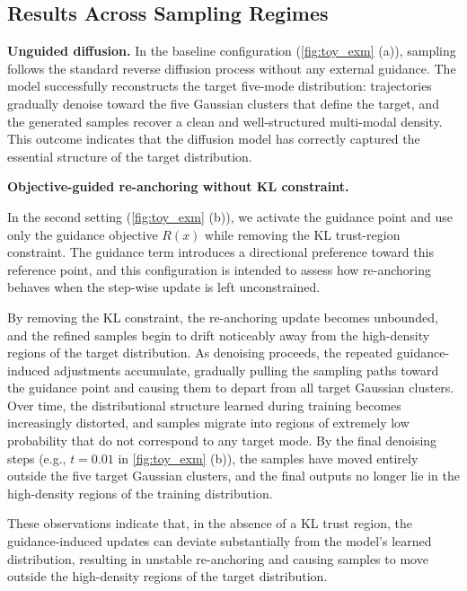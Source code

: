 \documentclass[10pt,twocolumn,letterpaper]{article}
\theoremstyle{plain}
\theoremstyle{remark}
\renewcommand{\paragraph}[1]{\vspace{.5em}\noindent\textbf{#1.}}
\begin{document}
\subsection{Results Across Sampling Regimes}
\paragraph{Unguided diffusion}
In the baseline configuration (\cref{fig:toy_exm} (a)), sampling follows the standard reverse diffusion process without any external guidance.
The model successfully reconstructs the target five-mode distribution:
trajectories gradually denoise toward the five Gaussian clusters that define the target, and the generated samples recover a clean and well-structured multi-modal density.
This outcome indicates that the diffusion model has correctly captured the essential structure of the target distribution.


\paragraph{Objective-guided re-anchoring without KL constraint}

In the second setting (\cref{fig:toy_exm} (b)), we activate the guidance point and use only the guidance objective $R(x)$ while removing the KL trust-region constraint.
The guidance term introduces a directional preference toward this reference point, and this configuration is intended to assess how re-anchoring behaves when the step-wise update is left unconstrained.

By removing the KL constraint, the re-anchoring update becomes unbounded, and the refined samples begin to drift noticeably away from the high-density regions of the target distribution. As denoising proceeds, the repeated guidance-induced adjustments accumulate, gradually pulling the sampling paths toward the guidance point and causing them to depart from all target Gaussian clusters. Over time, the distributional structure learned during training becomes increasingly distorted, and samples migrate into regions of extremely low probability that do not correspond to any target mode. 
By the final denoising steps (e.g., $t=0.01$ in \cref{fig:toy_exm} (b)),
the samples have moved entirely outside the five target Gaussian clusters,
and the final outputs no longer lie in the high-density regions of the training distribution.

These observations indicate that, in the absence of a KL trust region, the guidance-induced updates can deviate substantially from the model’s learned distribution, resulting in unstable re-anchoring and causing samples to move outside the high-density regions of the target distribution.
\end{document}

